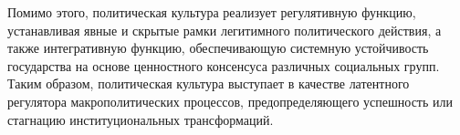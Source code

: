 Помимо этого, политическая культура реализует регулятивную функцию, устанавливая явные и скрытые рамки легитимного политического действия, а также интегративную функцию, обеспечивающую системную устойчивость государства на основе ценностного консенсуса различных социальных групп. Таким образом, политическая культура выступает в качестве латентного регулятора макрополитических процессов, предопределяющего успешность или стагнацию институциональных трансформаций.
